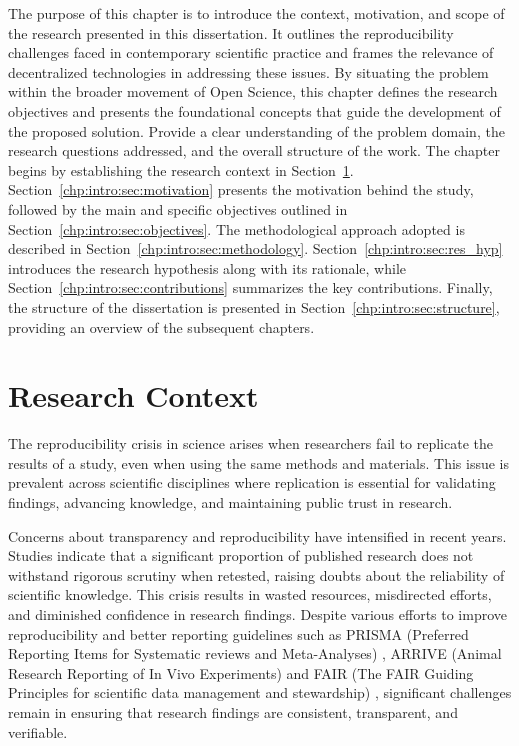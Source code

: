 \documentclass[final]{rc-book-2.14}
\begin{document}
\drop The purpose of this chapter is to introduce the context, motivation, and scope of the research presented in this dissertation. It outlines the reproducibility challenges faced in contemporary scientific practice and frames the relevance of decentralized technologies in addressing these issues. By situating the problem within the broader movement of Open Science, this chapter defines the research objectives and presents the foundational concepts that guide the development of the proposed solution. Provide a clear understanding of the problem domain, the research questions addressed, and the overall structure of the work. The chapter begins by establishing the research context in Section~\ref{chp:intro:sec:context}. Section~\ref{chp:intro:sec:motivation} presents the motivation behind the study, followed by the main and specific objectives outlined in Section~\ref{chp:intro:sec:objectives}. The methodological approach adopted is described in Section~\ref{chp:intro:sec:methodology}. Section~\ref{chp:intro:sec:res_hyp} introduces the research hypothesis along with its rationale, while Section~\ref{chp:intro:sec:contributions} summarizes the key contributions. Finally, the structure of the dissertation is presented in Section~\ref{chp:intro:sec:structure}, providing an overview of the subsequent chapters.



\newpage


\section{Research Context}
\label{chp:intro:sec:context}

The reproducibility crisis in science arises when researchers fail to replicate the results of a study, even when using the same methods and materials. This issue is prevalent across scientific disciplines where replication is essential for validating findings, advancing knowledge, and maintaining public trust in research.

Concerns about transparency and reproducibility have intensified in recent years. Studies indicate that a significant proportion of published research does not withstand rigorous scrutiny when retested, raising doubts about the reliability of scientific knowledge. This crisis results in wasted resources, misdirected efforts, and diminished confidence in research findings. Despite various efforts to improve reproducibility and better reporting guidelines such as PRISMA (Preferred Reporting Items for Systematic reviews and Meta-Analyses) \cite{Pagen71}, ARRIVE (Animal Research Reporting of In Vivo Experiments) \cite{percie2020arrive} and FAIR (The FAIR Guiding Principles for scientific data management and stewardship) \cite{wilkinson2016fair}, significant challenges remain in ensuring that research findings are consistent, transparent, and verifiable.
\end{document}
